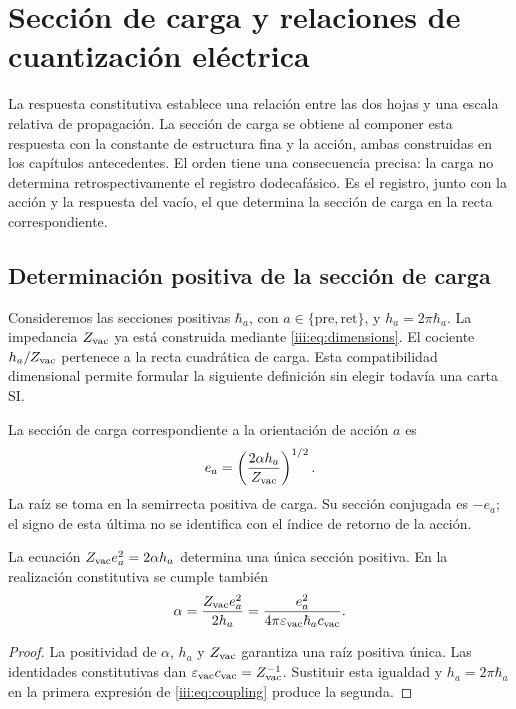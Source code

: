 \section{Sección de carga y relaciones de cuantización eléctrica}
\label{iii:sec:carga}

La respuesta constitutiva establece una relación entre las dos hojas y una
escala relativa de propagación. La sección de carga se obtiene al componer
esta respuesta con la constante de estructura fina y la acción, ambas
construidas en los capítulos antecedentes. El orden tiene una consecuencia
precisa: la carga no determina retrospectivamente el registro dodecafásico.
Es el registro, junto con la acción y la respuesta del vacío, el que
determina la sección de carga en la recta correspondiente.

\subsection{Determinación positiva de la sección de carga}

Consideremos las secciones positivas $\hbar_a$, con
$a\in\{\mathrm{pre},\mathrm{ret}\}$, y $h_a=2\pi\hbar_a$.
La impedancia $Z_{\rm vac}$ ya está construida mediante
\eqref{iii:eq:dimensions}. El cociente $h_a/Z_{\rm vac}$ pertenece a
la recta cuadrática de carga. Esta compatibilidad dimensional permite
formular la siguiente definición sin elegir todavía una carta SI.

\begin{definition}
La sección de carga correspondiente a la orientación de acción $a$ es
\begin{equation}
 e_a=\left(\frac{2\alpha h_a}{Z_{\rm vac}}\right)^{1/2}.
 \label{iii:eq:charge}
\end{equation}
La raíz se toma en la semirrecta positiva de carga. Su sección conjugada
es $-e_a$; el signo de esta última no se identifica con el índice de
retorno de la acción.
\end{definition}

\begin{proposition}
La ecuación $Z_{\rm vac}e_a^2=2\alpha h_a$ determina una única sección
positiva. En la realización constitutiva se cumple también
\begin{equation}
 \alpha=\frac{Z_{\rm vac}e_a^2}{2h_a}
 =\frac{e_a^2}{4\pi\varepsilon_{\rm vac}\hbar_a c_{\rm vac}}.
 \label{iii:eq:coupling}
\end{equation}
\end{proposition}
\begin{proof}
La positividad de $\alpha$, $h_a$ y $Z_{\rm vac}$ garantiza una raíz
positiva única. Las identidades constitutivas dan
$\varepsilon_{\rm vac}c_{\rm vac}=Z_{\rm vac}^{-1}$.
Sustituir esta igualdad y $h_a=2\pi\hbar_a$ en la primera expresión
de \eqref{iii:eq:coupling} produce la segunda.
\end{proof}

